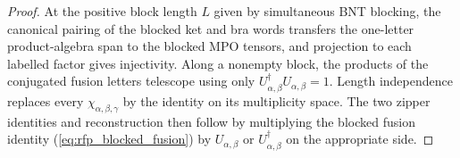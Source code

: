 \begin{proof}\leanok
    At the positive block length $L$ given by simultaneous BNT blocking,
    the canonical pairing of the blocked ket and bra words transfers the
    one-letter product-algebra span to the blocked MPO tensors, and projection
    to each labelled factor gives injectivity. Along a nonempty block, the
    products of the conjugated fusion letters telescope using only
    $U_{\alpha,\beta}^\dagger U_{\alpha,\beta}=1$. Length independence
    replaces every $\chi_{\alpha,\beta,\gamma}$ by the identity on its
    multiplicity space. The two zipper identities and reconstruction then
    follow by multiplying the blocked fusion
    identity (\ref{eq:rfp_blocked_fusion}) by
    $U_{\alpha,\beta}$ or $U_{\alpha,\beta}^\dagger$ on the appropriate side.
\end{proof}

